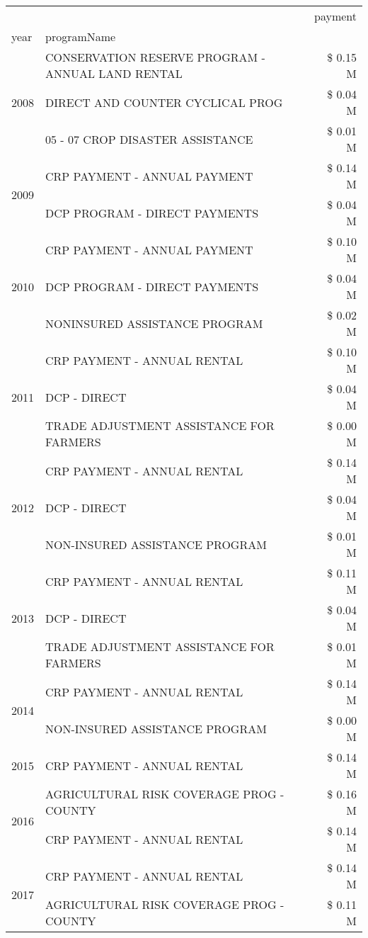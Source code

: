 \begin{tabular}{llr}
\toprule
 &  & payment \\
year & programName &  \\
\midrule
\multirow[t]{3}{*}{2008} & CONSERVATION RESERVE PROGRAM - ANNUAL LAND RENTAL & \$ 0.15 M \\
 & DIRECT AND COUNTER CYCLICAL PROG & \$ 0.04 M \\
 & 05 - 07 CROP DISASTER ASSISTANCE & \$ 0.01 M \\
\cline{1-3}
\multirow[t]{2}{*}{2009} & CRP PAYMENT - ANNUAL PAYMENT & \$ 0.14 M \\
 & DCP PROGRAM - DIRECT PAYMENTS & \$ 0.04 M \\
\cline{1-3}
\multirow[t]{3}{*}{2010} & CRP PAYMENT - ANNUAL PAYMENT & \$ 0.10 M \\
 & DCP PROGRAM - DIRECT PAYMENTS & \$ 0.04 M \\
 & NONINSURED ASSISTANCE PROGRAM & \$ 0.02 M \\
\cline{1-3}
\multirow[t]{3}{*}{2011} & CRP PAYMENT - ANNUAL RENTAL & \$ 0.10 M \\
 & DCP - DIRECT & \$ 0.04 M \\
 & TRADE ADJUSTMENT ASSISTANCE FOR FARMERS & \$ 0.00 M \\
\cline{1-3}
\multirow[t]{3}{*}{2012} & CRP PAYMENT - ANNUAL RENTAL & \$ 0.14 M \\
 & DCP - DIRECT & \$ 0.04 M \\
 & NON-INSURED ASSISTANCE PROGRAM & \$ 0.01 M \\
\cline{1-3}
\multirow[t]{3}{*}{2013} & CRP PAYMENT - ANNUAL RENTAL & \$ 0.11 M \\
 & DCP - DIRECT & \$ 0.04 M \\
 & TRADE ADJUSTMENT ASSISTANCE FOR FARMERS & \$ 0.01 M \\
\cline{1-3}
\multirow[t]{2}{*}{2014} & CRP PAYMENT - ANNUAL RENTAL & \$ 0.14 M \\
 & NON-INSURED ASSISTANCE PROGRAM & \$ 0.00 M \\
\cline{1-3}
2015 & CRP PAYMENT - ANNUAL RENTAL & \$ 0.14 M \\
\cline{1-3}
\multirow[t]{2}{*}{2016} & AGRICULTURAL RISK COVERAGE PROG - COUNTY & \$ 0.16 M \\
 & CRP PAYMENT - ANNUAL RENTAL & \$ 0.14 M \\
\cline{1-3}
\multirow[t]{3}{*}{2017} & CRP PAYMENT - ANNUAL RENTAL & \$ 0.14 M \\
 & AGRICULTURAL RISK COVERAGE PROG - COUNTY & \$ 0.11 M \\

\end{tabular}
